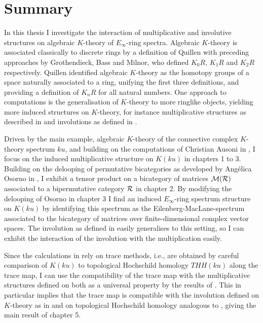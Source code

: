 \documentclass[12pt,bibliography=totoc,final]{scrbook} %
\begin{document}
\section*{Summary}\pagestyle{empty}
In this thesis I investigate the interaction of multiplicative and involutive structures
on algebraic $K$-theory of $E_\infty$-ring spectra. Algebraic $K$-theory is 
associated classically to discrete rings by a definition of Quillen \cite{Q1973} with
preceding approaches by Grothendieck, Bass and Milnor, who defined $K_0R$, $K_1R$ and $K_2R$ respectively.
Quillen identified algebraic $K$-theory as the homotopy groups of a space naturally associated
to a ring, unifying the first three definitions, and providing a
definition of $K_nR$ for all natural numbers. One approach to computations is the generalisation
of $K$-theory to more ringlike objects, yielding more induced structures
on $K$-theory, for instance multiplicative structures as described in \cite{EM,GGN,BGT,May2009} and 
involutions as defined in \cite{Ri2010}.

Driven by the main example, algebraic $K$-theory of the connective complex $K$-theory spectrum $ku$, and
building on the computations of Christian Ausoni in \cite{AuKku,AuTHH}, I focus on the induced multiplicative
structure on $K(ku)$ in chapters 1 to 3. Building on the delooping of permutative bicategories as developed
by Ang\'elica Osorno in \cite{Os}, I exhibit a tensor product on a bicategory of matrices $\mathcal{M}(\mathcal{R})$ associated
to a bipermutative category $\mathcal{R}$ in chapter 2. By modifying 
the delooping of Osorno in chapter 3 I find an induced $E_\infty$-ring spectrum structure on $K(ku)$ by
identifying this spectrum as the Eilenberg-MacLane-spectrum associated to the bicategory of matrices
over finite-dimensional complex vector spaces. The involution as defined in \cite{Ri2010} easily
generalises to this setting, so I can exhibit the interaction of the involution with the multiplication
easily.

Since the calculations in \cite{AuKku,AuTHH} rely on trace methods, i.e., are obtained by careful
comparison of $K(ku)$ to topological Hochschild homology $THH(ku)$ along the trace map, I can use
the compatibility of the trace map with the multiplicative structures defined on both as a universal
property by the results of \cite{BGT2013,BGT}. This in particular implies that the trace map is
compatible with the involution defined on $K$-theory as in \cite{Ri2010} and on topological
Hochschild homology analogous to \cite{Loday}, giving the main result of chapter 5.
\end{document}
